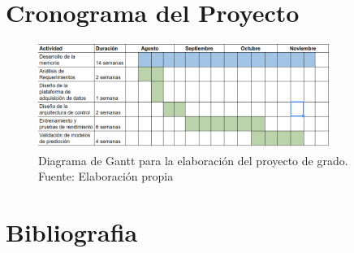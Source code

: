 \documentclass[12pt,letterpaper]{article}
\begin{document}
\newpage
\section{Cronograma del Proyecto}

\begin{figure}[!ht] 
    \centering
    \includegraphics[width=0.85\textwidth]{cronograma}
    \caption{Diagrama de Gantt para la elaboración del proyecto de grado. Fuente: Elaboración propia}
    \label{fig:cronograma}
    \end{figure}

\newpage
\section{Bibliografia}



\end{document}
